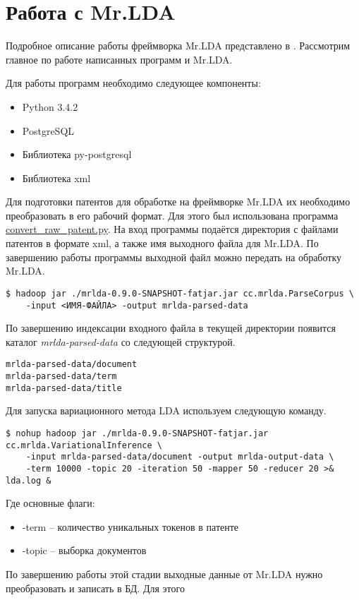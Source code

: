 \section{Работа с Mr.LDA}
Подробное описание работы фреймворка Mr.LDA представлено в \cite{mrlda}. Рассмотрим главное по работе 
написанных программ и Mr.LDA.

Для работы программ необходимо следующее компоненты:
\begin{itemize}
    \item Python 3.4.2
    \item PostgreSQL
    \item Библиотека py-postgresql
    \item Библиотека xml
\end{itemize}

Для подготовки патентов для обработке на фреймворке Mr.LDA их необходимо преобразовать в его рабочий формат. 
Для этого был использована программа 
\href{https://github.com/SemPatent/Golubev/blob/master/convert_raw_patent.py}{convert\_raw\_patent.py}. На 
вход программы подаётся директория с файлами патентов в формате xml, а также имя выходного файла для Mr.LDA.
По завершению работы программы выходной файл можно передать на обработку Mr.LDA. 
\begin{lstlisting}
$ hadoop jar ./mrlda-0.9.0-SNAPSHOT-fatjar.jar cc.mrlda.ParseCorpus \
    -input <ИМЯ-ФАЙЛА> -output mrlda-parsed-data
\end{lstlisting}
По завершению индексации входного файла в текущей директории появится каталог \emph{mrlda-parsed-data} со следующей структурой.
\begin{lstlisting}
mrlda-parsed-data/document
mrlda-parsed-data/term
mrlda-parsed-data/title
\end{lstlisting}
Для запуска вариационного метода LDA используем следующую команду. 
\begin{lstlisting}
$ nohup hadoop jar ./mrlda-0.9.0-SNAPSHOT-fatjar.jar cc.mrlda.VariationalInference \
    -input mrlda-parsed-data/document -output mrlda-output-data \
    -term 10000 -topic 20 -iteration 50 -mapper 50 -reducer 20 >& lda.log &
\end{lstlisting}
Где основные флаги:
\begin{itemize}
    \item -term -- количество уникальных токенов в патенте
    \item -topic -- выборка документов
\end{itemize}
По завершению работы этой стадии выходные данные от Mr.LDA нужно преобразовать и записать в БД. Для этого 
